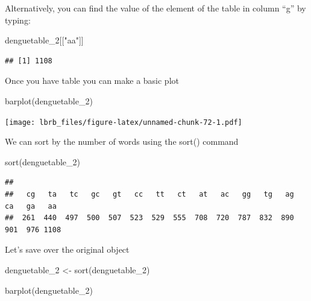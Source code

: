 \documentclass[
]{book}
\newenvironment{Shaded}{\begin{snugshade}}{\end{snugshade}}
\newcommand{\FunctionTok}[1]{\textcolor[rgb]{0.00,0.00,0.00}{#1}}
\newcommand{\NormalTok}[1]{#1}
\newcommand{\OtherTok}[1]{\textcolor[rgb]{0.56,0.35,0.01}{#1}}
\newcommand{\StringTok}[1]{\textcolor[rgb]{0.31,0.60,0.02}{#1}}
\begin{document}
Alternatively, you can find the value of the element of the table in column ``g'' by typing:

\begin{Shaded}
\begin{Highlighting}[]
\NormalTok{denguetable\_2[[}\StringTok{"aa"}\NormalTok{]]}
\end{Highlighting}
\end{Shaded}

\begin{verbatim}
## [1] 1108
\end{verbatim}

Once you have table you can make a basic plot

\begin{Shaded}
\begin{Highlighting}[]
\FunctionTok{barplot}\NormalTok{(denguetable\_2)}
\end{Highlighting}
\end{Shaded}

\texttt{[image: lbrb\_files/figure-latex/unnamed-chunk-72-1.pdf]}

We can sort by the number of words using the sort() command

\begin{Shaded}
\begin{Highlighting}[]
\FunctionTok{sort}\NormalTok{(denguetable\_2)}
\end{Highlighting}
\end{Shaded}

\begin{verbatim}
## 
##   cg   ta   tc   gc   gt   cc   tt   ct   at   ac   gg   tg   ag   ca   ga   aa 
##  261  440  497  500  507  523  529  555  708  720  787  832  890  901  976 1108
\end{verbatim}

Let's save over the original object

\begin{Shaded}
\begin{Highlighting}[]
\NormalTok{denguetable\_2 }\OtherTok{\textless{}{-}} \FunctionTok{sort}\NormalTok{(denguetable\_2)}
\end{Highlighting}
\end{Shaded}

\begin{Shaded}
\begin{Highlighting}[]
\FunctionTok{barplot}\NormalTok{(denguetable\_2)}
\end{Highlighting}
\end{Shaded}
\end{document}
